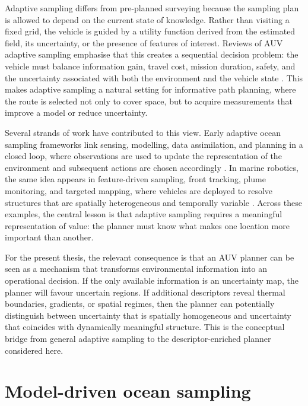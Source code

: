 Adaptive sampling differs from pre-planned surveying because the sampling plan is allowed to depend on the current state of knowledge. Rather than visiting a fixed grid, the vehicle is guided by a utility function derived from the estimated field, its uncertainty, or the presence of features of interest. Reviews of AUV adaptive sampling emphasise that this creates a sequential decision problem: the vehicle must balance information gain, travel cost, mission duration, safety, and the uncertainty associated with both the environment and the vehicle state \parencite{hwang2019auvreview}. This makes adaptive sampling a natural setting for informative path planning, where the route is selected not only to cover space, but to acquire measurements that improve a model or reduce uncertainty.

Several strands of work have contributed to this view. Early adaptive ocean sampling frameworks link sensing, modelling, data assimilation, and planning in a closed loop, where observations are used to update the representation of the environment and subsequent actions are chosen accordingly \parencite{lermusiaux2007adaptive}. In marine robotics, the same idea appears in feature-driven sampling, front tracking, plume monitoring, and targeted mapping, where vehicles are deployed to resolve structures that are spatially heterogeneous and temporally variable \parencite{das2012coordinated,fossum2018informationdriven,fossum2019phytoplankton}. Across these examples, the central lesson is that adaptive sampling requires a meaningful representation of value: the planner must know what makes one location more important than another.

For the present thesis, the relevant consequence is that an AUV planner can be seen as a mechanism that transforms environmental information into an operational decision. If the only available information is an uncertainty map, the planner will favour uncertain regions. If additional descriptors reveal thermal boundaries, gradients, or spatial regimes, then the planner can potentially distinguish between uncertainty that is spatially homogeneous and uncertainty that coincides with dynamically meaningful structure. This is the conceptual bridge from general adaptive sampling to the descriptor-enriched planner considered here.

\section{Model-driven ocean sampling}
\label{sec:sota_model_driven_sampling}

